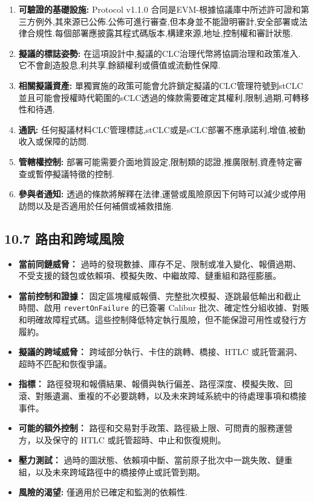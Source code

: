 \documentclass[11pt]{article}
\begin{document}
\begin{enumerate}[leftmargin=*]
\item \textbf{可驗證的基礎設施:} Protocol v1.1.0 合同是EVM-根據協議庫中所述許可證和第三方例外,其來源已公佈.公佈可進行審查,但本身並不能證明審計,安全部署或法律合規性.每個部署應披露其程式碼版本,構建來源,地址,控制權和審計狀態.
\item \textbf{擬議的標誌姿勢:} 在這項設計中,擬議的CLC治理代幣將協調治理和政策准入. 它不會創造股息,利共享,餘額權利或價值或流動性保障.
\item \textbf{相關擬議資產:} 單獨實施的政策可能會允許鎖定擬議的CLC管理符號到stCLC並且可能會授權時代範圍的sCLC透過的條款需要確定其權利,限制,過期,可轉移性和待遇.
\item \textbf{通訊:} 任何擬議材料CLC管理標誌,stCLC或是sCLC部署不應承諾利,增值,被動收入或保障的訪問.
\item \textbf{管轄權控制:} 部署可能需要介面地質設定,限制類的認證,推廣限制,資產特定審查或暫停擬議特徵的控制.
\item \textbf{參與者通知:} 透過的條款將解釋在法律,運營或風險原因下何時可以減少或停用訪問以及是否適用於任何補償或補救措施.
\end{enumerate}
\subsection*{10.7 路由和跨域風險}

\begin{itemize}[leftmargin=*]
\item \textbf{當前同鏈威脅：} 過時的發現數據、庫存不足、限制或准入變化、報價過期、不受支援的錢包或依賴項、模擬失敗、中繼故障、鏈重組和路徑膨脹。
\item \textbf{當前控制和證據：} 固定區塊權威報價、完整批次模擬、逐跳最低輸出和截止時間、啟用 \texttt{revertOnFailure} 的已簽署 Calibur 批次、確定性分組收據、對賬和明確故障程式碼。這些控制降低特定執行風險，但不能保證可用性或發行方履約。
\item \textbf{擬議的跨域威脅：} 跨域部分執行、卡住的跳轉、橋接、HTLC 或託管漏洞、超時不匹配和恢復爭議。
\item \textbf{指標：} 路徑發現和報價結果、報價與執行偏差、路徑深度、模擬失敗、回滾、對賬遺漏、重複的不必要跳轉，以及未來跨域系統中的待處理事項和橋接事件。
\item \textbf{可能的額外控制：} 路徑和交易對手政策、路徑級上限、可問責的服務運營方，以及保守的 HTLC 或託管超時、中止和恢復規則。
\item \textbf{壓力測試：} 過時的圖狀態、依賴項中斷、當前原子批次中一跳失敗、鏈重組，以及未來跨域路徑中的橋接停止或託管到期。
\item \textbf{風險的渴望:} 僅適用於已確定和監測的依賴性.
\end{itemize}
\end{document}
